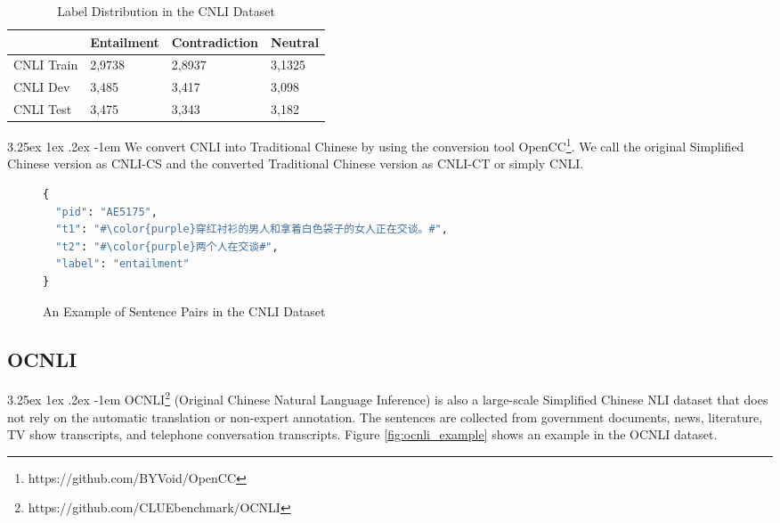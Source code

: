 \documentclass[12pt]{article}
\makeatletter
\renewcommand\paragraph{\@startsection{paragraph}{5}{\z@}%
  {3.25ex \@plus1ex \@minus.2ex}%
  {-1em}%
  {\normalfont\normalsize\bfseries}}
\makeatother
\begin{document}
\begin{CJK*}{UTF8}{bkai}
\begin{spacing}{1.77}
\begin{table}[H]
  \centering
  \setlength{\extrarowheight}{-3pt}
  \begin{tabular}{|l|R{3cm}|R{3cm}|R{3cm}|}
  \hline
             & Entailment & Contradiction & Neutral \\ \hline
  CNLI Train & 2,9738     & 2,8937        & 3,1325  \\ \hline
  CNLI Dev   & 3,485      & 3,417         & 3,098   \\ \hline
  CNLI Test  & 3,475      & 3,343         & 3,182   \\ \hline
  \end{tabular}
  \caption{Label Distribution in the CNLI Dataset}
  \label{tab:label_cnli}
\end{table}

\paragraph{}
We convert CNLI into Traditional Chinese by using the conversion tool OpenCC\footnote{https://github.com/BYVoid/OpenCC}. We call the original Simplified Chinese version as CNLI-CS and the converted Traditional Chinese version as CNLI-CT or simply CNLI.

\begin{figure}
\caption{An Example of Sentence Pairs in the CNLI Dataset}
\begin{CJK*}{UTF8}{gbsn}
\begin{lstlisting}[language=Python, escapechar=\#]
{
  "pid": "AE5175",
  "t1": "#\color{purple}穿红衬衫的男人和拿着白色袋子的女人正在交谈。#",
  "t2": "#\color{purple}两个人在交谈#",
  "label": "entailment"
}
\end{lstlisting}
\end{CJK*}
\label{fig:cnli_example}
\end{figure}

\subsection{OCNLI} \label{sec:ocnli}
\paragraph{}
OCNLI\footnote{https://github.com/CLUEbenchmark/OCNLI} (Original Chinese Natural Language Inference) is also a large-scale Simplified Chinese NLI dataset that does not rely on the automatic translation or non-expert annotation. The sentences are collected from government documents, news, literature, TV show
transcripts, and telephone conversation transcripts. Figure \ref{fig:ocnli_example} shows an example in the OCNLI dataset.


\end{spacing}
\end{CJK*}
\end{document}

